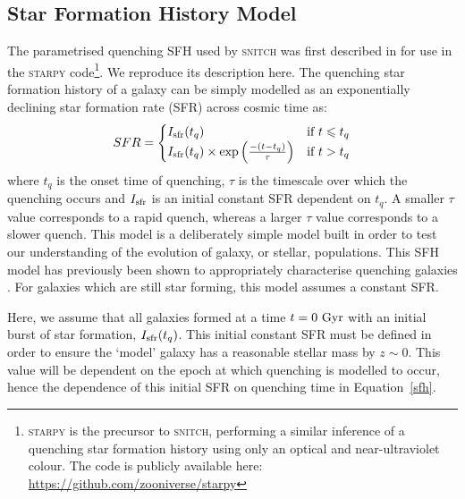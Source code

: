 \documentclass[useAMS,usenatbib]{mn2e}
\begin{document}
\subsection{Star Formation History Model}\label{sec:sfh}

The parametrised quenching SFH used by \textsc{snitch} was first described in \cite{smethurst15} for use in the \textsc{starpy} code\footnote{\textsc{starpy} is the precursor to \textsc{snitch}, performing a similar inference of a quenching star formation history using only an optical and near-ultraviolet colour. The code is publicly available here: \url{https://github.com/zooniverse/starpy}}. We reproduce its description here. The quenching star formation history of a galaxy can be simply modelled as an exponentially declining star formation rate (SFR) across cosmic time as:
\begin{equation}\label{sfh}
SFR =
\begin{cases}
I_{\rm{sfr}}(t_q) & \text{if } t \leq t_q \\
I_{\rm{sfr}}(t_q) \times \exp{\left( \frac{-(t-t_{q})}{\tau}\right)} & \text{if } t > t_q 
\end{cases}
\end{equation}
where $t_{q}$ is the onset time of quenching, $\tau$ is the timescale over which the quenching occurs and $I_{\rm{sfr}}$ is an initial constant SFR dependent on $t_q$.  A smaller $\tau$ value corresponds to a rapid quench, whereas a larger $\tau$ value corresponds to a slower quench. This model is a deliberately simple model built in order to test our understanding of the evolution of galaxy, or stellar, populations. This SFH model has previously been shown to appropriately characterise quenching galaxies \citep{weiner06, martin07, noeske07,schawinski14, smethurst15}. For galaxies which are still star forming, this model assumes a constant SFR.



Here, we assume that all galaxies formed at a time $t=0~\rm{Gyr}$ with an initial burst of star formation, $I_{\rm{sfr}}(t_q)$. This initial constant SFR must be defined in order to ensure the `model' galaxy  has a reasonable stellar mass by $z\sim0$. This value will be dependent on the epoch at which quenching is modelled to occur, hence the dependence of this initial SFR on quenching time in Equation~\ref{sfh}. 
\end{document}
